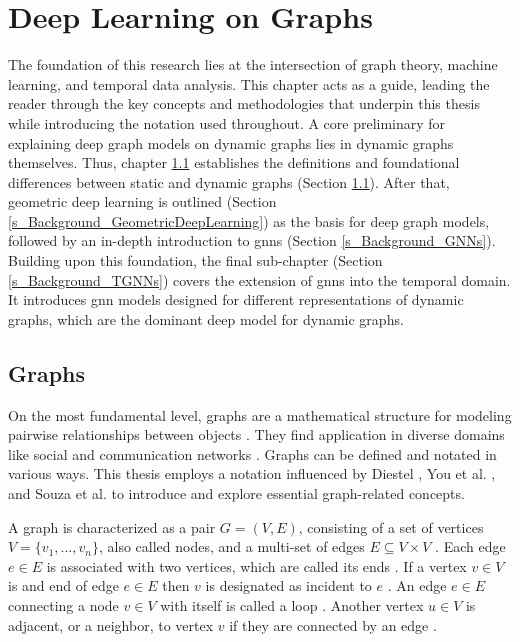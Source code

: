 \section{Deep Learning on Graphs}
\label{s_Background}

The foundation of this research lies at the intersection of graph theory, machine learning, and temporal data analysis. 
This chapter acts as a guide, leading the reader through the key concepts and methodologies that underpin this thesis while introducing the notation used throughout.
A core preliminary for explaining deep graph models on dynamic graphs lies in dynamic graphs themselves. Thus, chapter \ref{s_Background_Graphs} establishes the definitions and foundational differences between static and dynamic graphs (Section \ref{s_Background_Graphs}). After that, geometric deep learning is outlined (Section \ref{s_Background_GeometricDeepLearning}) as the basis for deep graph models, followed by an in-depth introduction to \glspl{gnn} (Section \ref{s_Background_GNNs}). Building upon this foundation, the final sub-chapter (Section \ref{s_Background_TGNNs}) covers the extension of \glspl{gnn} into the temporal domain. It introduces \gls{gnn} models designed for different representations of dynamic graphs, which are the dominant deep model for dynamic graphs. 

\subsection{Graphs}
\label{s_Background_Graphs}
On the most fundamental level, graphs are a mathematical structure for modeling pairwise relationships between objects \cite{diestel_graph_2017}. They find application in diverse domains like social and communication networks \cite{bronstein_geometric_2017}. Graphs can be defined and notated in various ways. This thesis employs a notation influenced by Diestel \cite{diestel_graph_2017}, You et al. \cite{you_roland_2022}, and Souza et al. \cite{souza_provably_2022} to introduce and explore essential graph-related concepts.

A graph is characterized as a pair $G = (V, E)$, consisting of a set of vertices $V= \{v_1,...,v_n\}$, also called nodes, and a multi-set of edges $E \subseteq V \times V$ \cite{diestel_graph_2017, you_roland_2022}. Each edge $e \in E$ is associated with two vertices, which are called its ends \cite{diestel_graph_2017}. If a vertex $v \in V$ is and end of edge $e \in E$ then $v$ is designated as incident to $e$ \cite{diestel_graph_2017}. An edge $e \in E$ connecting a node $v \in V$ with itself is called a loop \cite{diestel_graph_2017}. Another vertex $u \in V$ is adjacent, or a neighbor, to vertex $v$ if they are connected by an edge \cite{diestel_graph_2017}. 

